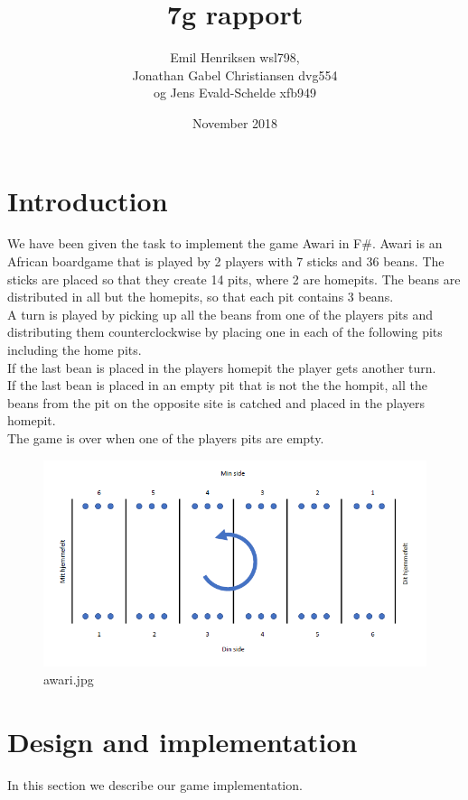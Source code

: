 \documentclass{article}
\title{7g rapport}
\author{Emil Henriksen wsl798,\\ Jonathan Gabel Christiansen dvg554\\ og Jens Evald-Schelde  xfb949}
\date{November 2018}
\begin{document}
\maketitle
\newpage
\section*{Introduction}
We have been given the task to implement the game Awari in F\#.
Awari is an African boardgame that is played by 2 players with 7 sticks and 36 beans. The sticks are placed so that they create 14 pits, where 2 are homepits. The beans are distributed in all but the homepits, so that each pit contains 3 beans.\\
A turn is played by picking up all the beans from one of the players pits and distributing them counterclockwise by placing one in each of the following pits including the home pits.\\
If the last bean is placed in the players homepit the player gets another turn.\\
If the last bean is placed in an empty pit that is not the the hompit, all the beans from the pit on the opposite site is catched and placed in the players homepit.\\
The game is over when one of the players pits are empty.

\begin{figure}[h]
  \includegraphics[width=\linewidth]{awari.jpg}
  \caption{awari.jpg}
  \label{fig:A picture of Awari}
\end{figure}

\section{Design and implementation}
In this section we describe our game implementation.\\
\end{document}
